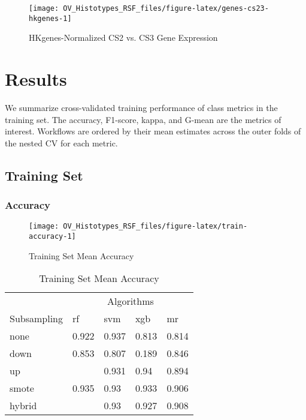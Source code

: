 \documentclass[
]{report}
\begin{document}
\begin{figure}[H]

{\centering \texttt{[image: OV\_Histotypes\_RSF\_files/figure-latex/genes-cs23-hkgenes-1]} 

}

\caption{HKgenes-Normalized CS2 vs. CS3 Gene Expression}\label{fig:genes-cs23-hkgenes}
\end{figure}

\chapter{Results}\label{results}

We summarize cross-validated training performance of class metrics in the training set. The accuracy, F1-score, kappa, and G-mean are the metrics of interest. Workflows are ordered by their mean estimates across the outer folds of the nested CV for each metric.

\section{Training Set}\label{training-set}

\subsection{Accuracy}\label{accuracy-1}

\begin{figure}[H]

{\centering \texttt{[image: OV\_Histotypes\_RSF\_files/figure-latex/train-accuracy-1]} 

}

\caption{Training Set Mean Accuracy}\label{fig:train-accuracy}
\end{figure}

\begin{table}

\caption{\label{tab:train-accuracy-table}Training Set Mean Accuracy}
\centering
\begin{tabular}[t]{l|l|l|l|l}
\hline
\multicolumn{1}{c|}{ } & \multicolumn{4}{c}{Algorithms} \\
\cline{2-5}
Subsampling & rf & svm & xgb & mr\\
\hline
none & 0.922 & 0.937 & 0.813 & 0.814\\
\hline
down & 0.853 & 0.807 & 0.189 & 0.846\\
\hline
up & \cellcolor[HTML]{90ee90}{0.941} & 0.931 & 0.94 & 0.894\\
\hline
smote & 0.935 & 0.93 & 0.933 & 0.906\\
\hline
hybrid & \cellcolor[HTML]{90ee90}{0.941} & 0.93 & 0.927 & 0.908\\
\hline
\end{tabular}
\end{table}
\end{document}
